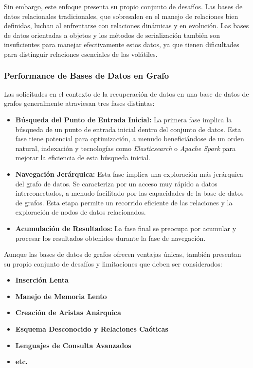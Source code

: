 \documentclass[pdflatex,sn-mathphys-num]{sn-jnl}
\theoremstyle{thmstyleone}%
\theoremstyle{thmstyletwo}%
\theoremstyle{thmstylethree}%
\begin{document}
Sin embargo, este enfoque presenta su propio conjunto de desafíos. Las bases de datos relacionales tradicionales, que sobresalen en el manejo de relaciones bien definidas, luchan al enfrentarse con relaciones dinámicas y en evolución. Las bases de datos orientadas a objetos y los métodos de serialización también son insuficientes para manejar efectivamente estos datos, ya que tienen dificultades para distinguir relaciones esenciales de las volátiles.

\subsubsection{Performance de Bases de Datos en Grafo}

Las solicitudes en el contexto de la recuperación de datos en una base de datos de grafos generalmente atraviesan tres fases distintas:

\begin{itemize}
    \item \textbf{Búsqueda del Punto de Entrada Inicial:} La primera fase implica la búsqueda de un punto de entrada inicial dentro del conjunto de datos. Esta fase tiene potencial para optimización, a menudo beneficiándose de un orden natural, indexación y tecnologías como \textit{Elasticsearch} o \textit{Apache Spark} para mejorar la eficiencia de esta búsqueda inicial.
    
    \item \textbf{Navegación Jerárquica:} Esta fase implica una exploración más jerárquica del grafo de datos. Se caracteriza por un acceso muy rápido a datos interconectados, a menudo facilitado por las capacidades de la base de datos de grafos. Esta etapa permite un recorrido eficiente de las relaciones y la exploración de nodos de datos relacionados.
    
    \item \textbf{Acumulación de Resultados:} La fase final se preocupa por acumular y procesar los resultados obtenidos durante la fase de navegación.
\end{itemize}

Aunque las bases de datos de grafos ofrecen ventajas únicas, también presentan su propio conjunto de desafíos y limitaciones que deben ser considerados:

\begin{itemize}
    \item \textbf{Inserción Lenta}
    
    \item \textbf{Manejo de Memoria Lento}

    \item \textbf{Creación de Aristas Anárquica}
        
    \item \textbf{Esquema Desconocido y Relaciones Caóticas}
    
    \item \textbf{Lenguajes de Consulta Avanzados} 

    \item \textbf{etc.}
\end{itemize}
\end{document}
